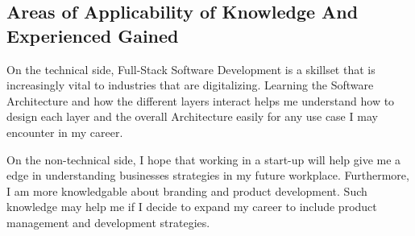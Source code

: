 \subsection{Areas of Applicability of Knowledge And Experienced Gained}
\noindent
On the technical side, Full-Stack Software Development is a skillset that is increasingly vital to industries that are digitalizing. Learning the Software Architecture and how the different layers interact helps me understand how to design each layer and the overall
Architecture easily for any use case I may encounter in my career.

\noindent
On the non-technical side, I hope that working in a start-up will help give me a edge in understanding businesses strategies in my future workplace. Furthermore, I am more knowledgable about branding and product development. Such knowledge may help me if I decide to expand my career
to include product management and development strategies.
